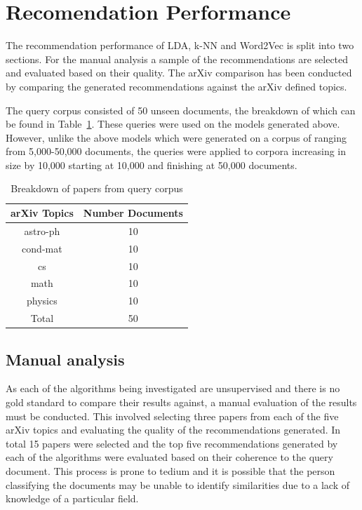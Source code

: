 \section{Recomendation Performance}
The recommendation performance of LDA, k-NN and Word2Vec is split into two sections.
For the manual analysis a sample of the recommendations are selected and evaluated based on their quality.
The arXiv comparison has been conducted by comparing the generated recommendations against the arXiv defined topics.

The query corpus consisted of 50 unseen documents, the breakdown of which can be found in Table~\ref{table:queryBreakdown}.
These queries were used on the models generated above.
However, unlike the above models which were generated on a corpus of ranging from 5,000-50,000 documents, the queries were applied to corpora increasing in size by 10,000 starting at 10,000 and finishing at 50,000 documents.

\begin{table}[h]
    \centering
    \begin{tabular}{|c c|}
         \hline
         arXiv Topics & Number Documents \\ [0.5ex]
         \hline\hline
         astro-ph & 10 \\
         cond-mat & 10 \\
         cs & 10 \\
         math & 10 \\
         physics & 10 \\ [0.5ex]
         \hline\hline
         Total & 50\\ [1ex]
         \hline
    \end{tabular}
    \caption{Breakdown of papers from query corpus}
    \label{table:queryBreakdown}
\end{table}

\subsection{Manual analysis}
As each of the algorithms being investigated are unsupervised and there is no gold standard to compare their results against, a manual evaluation of the results must be conducted.
This involved selecting three papers from each of the five arXiv topics and evaluating the quality of the recommendations generated.
In total 15 papers were selected and the top five recommendations generated by each of the algorithms were evaluated based on their coherence to the query document.
This process is prone to tedium and it is possible that the person classifying the documents may be unable to identify similarities due to a lack of knowledge of a particular field.

